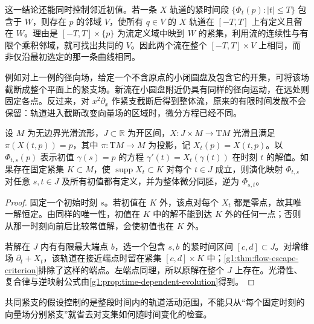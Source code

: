 这一结论还能同时控制邻近初值。若一条 \(X\) 轨道的紧时间段 \(\{\Phi_t(p):|t|\leq T\}\) 包含于 \(W\)，则存在 \(p\) 的邻域 \(V\)，使所有 \(q\in V\) 的 \(X\) 轨道在 \([-T,T]\) 上有定义且留在 \(W\)。理由是 \([-T,T]\times\{p\}\) 为流定义域中映到 \(W\) 的紧集，利用流的连续性与有限个乘积邻域，就可找出共同的 \(V\)。因此两个流在整个 \([-T,T]\times V\) 上相同，而非仅沿最初选定的那一条曲线相同。

\ProseParagraphBreak

例如对上一例的径向场，给定一个不含原点的小闭圆盘及包含它的开集，可将该场截断成整个平面上的紧支场。新流在小圆盘附近仍具有同样的径向运动，在远处则固定各点。反过来，对 \(x^2\partial_x\) 作紧支截断后得到整体流，原来的有限时间发散不会保留：轨道进入截断改变向量场的区域时，微分方程已经不同。

\begin{proposition}
	\label{g1:prop:compact-time-dependent-evolution}
	设 \(M\) 为无边界光滑流形，\(J\subset\mathbb R\) 为开区间，\(X:J\times M\to\mathrm{T}M\) 光滑且满足 \(\pi(X(t,p))=p\)，其中 \(\pi:\mathrm{T}M\to M\) 为投影，记 \(X_t(p)=X(t,p)\)。以 \(\Phi_{t,s}(p)\) 表示初值 \(\gamma(s)=p\) 的方程 \(\gamma'(t)=X_t(\gamma(t))\) 在时刻 \(t\) 的解值。如果存在固定紧集 \(K\subset M\)，使 \(\operatorname{supp}X_t\subset K\) 对每个 \(t\in J\) 成立，则演化映射 \(\Phi_{t,s}\) 对任意 \(s,t\in J\) 及所有初值都有定义，并为整体微分同胚，逆为 \(\Phi_{s,t}\)。
\end{proposition}
\begin{proof}
	固定一个初始时刻 \(s\)。若初值在 \(K\) 外，该点对每个 \(X_t\) 都是零点，故其唯一解恒定。由同样的唯一性，初值在 \(K\) 中的解不能到达 \(K\) 外的任何一点；否则从那一时刻向前后比较常值解，会使初值也在 \(K\) 外。

	若解在 \(J\) 内有有限最大端点 \(b\)，选一个包含 \(s,b\) 的紧时间区间 \([c,d]\subset J\)。对增维场 \(\partial_t+X_t\)，该轨道在接近端点时留在紧集 \([c,d]\times K\) 中；\cref{g1:thm:flow-escape-criterion}排除了这样的端点。左端点同理，所以原解在整个 \(J\) 上存在。光滑性、复合律与逆映射公式由\cref{g1:prop:time-dependent-evolution}得到。
\end{proof}

共同紧支的假设控制的是整段时间内的轨道活动范围，不能只从“每个固定时刻的向量场分别紧支”就省去对支集如何随时间变化的检查。

